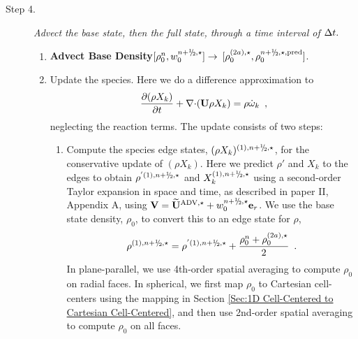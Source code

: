 \begin{description}
\begin{enumerate}
\end{enumerate}

\item[Step 4.] {\em Advect the base state, then the full state, through a time interval 
of $\Delta t.$}

\begin{enumerate}
\renewcommand{\theenumi}{{\bf \alph{enumi}}}

\item {\bf Advect Base Density}$[\rhozero^{n},w_0^{\nph,\star}] \rightarrow$ 
$[\rho_0^{(2a),\star}, \rho_0^{\nph,\star,{\rm pred}}]$.

\item Update the species.  Here we do a difference approximation
  to 
  \begin{equation}
  \frac{\partial (\rho X_k)}{\partial t} + \mathbf{\nabla} \mathbf{\cdot} ({\bf U} \rho X_k) =
         \rho {\dot{\omega}}_k \enskip , \label{eq:species}
  \end{equation}
  neglecting the reaction terms.  The update consists of two steps:

  \begin{enumerate}
  \renewcommand{\labelenumii}{{\bf \roman{enumii}}.}

  \item Compute the species edge states, $(\rho X_k)^{(1),\nph,\star}$,
  for the conservative update of $(\rho X_k)$. 
  Here we predict $\rho'$ and $X_k$ to the edges to obtain 
  $\rho^{'(1),\nph,\star}$ and $X_k^{(1),\nph,\star}$ using a second-order
  Taylor expansion in space and time, as described in paper II,
  Appendix A, using $\Vb = \uadvone+w_0^{\nph,\star} \er$.  We use the base
  state density, $\rho_0$, to convert this to an edge state for $\rho$,
\begin{equation}
\rho^{(1),\nph,\star} = 
\rho^{'(1),\nph,\star} + \frac{\rho_0^n + \rho_0^{(2a),\star}}{2} \enskip .
\label{eq:rhoXedgestate}
\end{equation}
  In plane-parallel, we use 4th-order spatial averaging to compute $\rho_0$ on 
  radial faces.  In spherical, we first map $\rho_0$ to Cartesian cell-centers 
  using the mapping in Section \ref{Sec:1D Cell-Centered to Cartesian Cell-Centered}, 
  and then use 2nd-order spatial averaging to compute $\rho_0$ on all faces.


\end{enumerate}
\end{enumerate}
\end{description}
